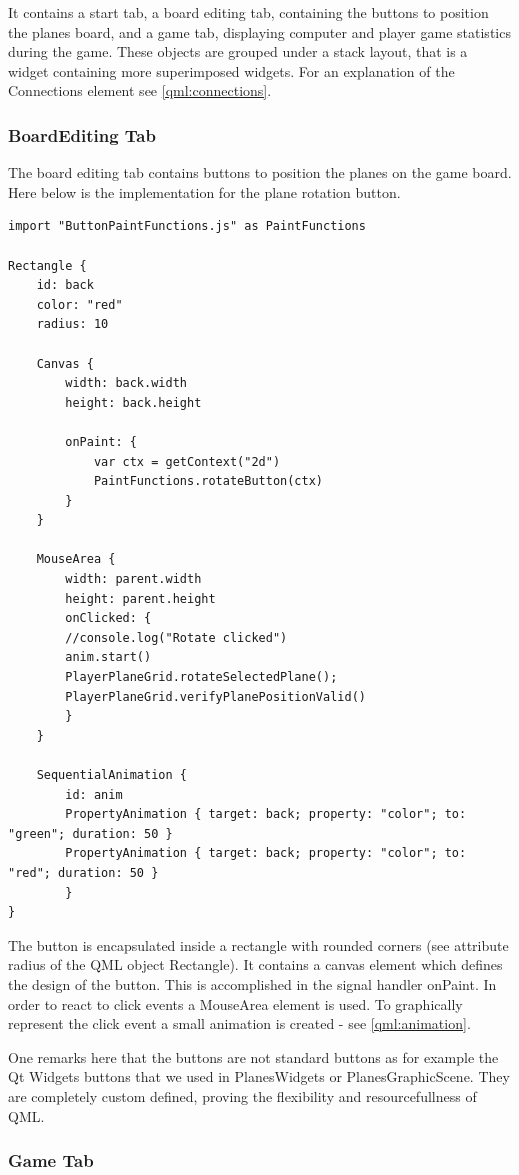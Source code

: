 It contains a start tab, a board editing tab, containing the buttons to position the planes board, and a game tab, displaying computer and player game statistics during the game. These objects are grouped under a stack layout, that is a widget containing more superimposed widgets. For an explanation of the Connections element see \ref{qml:connections}.

\subsubsection {BoardEditing Tab}

The board editing tab contains buttons to position the planes on the game board. Here below is the implementation for the plane rotation button.


\begin{lstlisting}
import "ButtonPaintFunctions.js" as PaintFunctions

Rectangle {
	id: back
	color: "red"
	radius: 10
	
	Canvas {
		width: back.width
		height: back.height
		
		onPaint: {
			var ctx = getContext("2d")
			PaintFunctions.rotateButton(ctx)
		}
	}
	
	MouseArea {
		width: parent.width
		height: parent.height
		onClicked: {
		//console.log("Rotate clicked")
		anim.start()
		PlayerPlaneGrid.rotateSelectedPlane();
		PlayerPlaneGrid.verifyPlanePositionValid()
		}
	}
	
	SequentialAnimation {
		id: anim
		PropertyAnimation { target: back; property: "color"; to: "green"; duration: 50 }
		PropertyAnimation { target: back; property: "color"; to: "red"; duration: 50 }
		}
}
\end{lstlisting}

The button is encapsulated inside a rectangle with rounded corners (see attribute radius of the QML object Rectangle). It contains a canvas element which defines the design of the button. This is accomplished in the signal handler onPaint. In order to react to click events a MouseArea element is used. To graphically represent the click event a small animation is created - see \ref{qml:animation}.

One remarks here that the buttons are not standard buttons as for example the Qt Widgets buttons that we used in PlanesWidgets or PlanesGraphicScene. They are completely custom defined, proving the flexibility and resourcefullness of QML.

\subsubsection {Game Tab}

